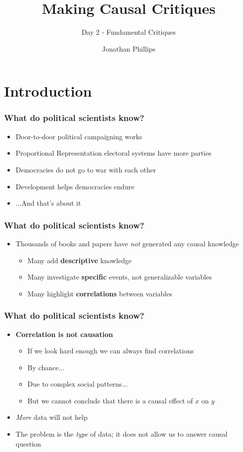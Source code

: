 \documentclass[xcolor=x11names,compress]{beamer}\usepackage[]{graphicx}\usepackage[]{color}
\title{Making Causal Critiques}
\subtitle{Day 2 - Fundamental Critiques}
\author{Jonathan Phillips}
\renewcommand{\(}{\begin{columns}}
\renewcommand{\)}{\end{columns}}
\newcommand{\<}[1]{\begin{column}{#1}}
\renewcommand{\>}{\end{column}}
\begin{document}
\frame{\titlepage}

\section{Introduction}

\begin{frame}
\frametitle{What do political scientists \textbf{know}?}
\begin{itemize}
\item Door-to-door political campaigning works
\item Proportional Representation electoral systems have more parties
\item Democracies do not go to war with each other
\item Development helps democracies endure
\item ...And that's about it
\end{itemize}
\end{frame}

\begin{frame}
\frametitle{What do political scientists \textbf{know}?}
\begin{itemize}
\item Thousands of books and papers have \textit{not} generated any causal knowledge
\begin{itemize}
\item Many add \textbf{descriptive} knowledge
\item Many investigate \textbf{specific} events, not generalizable variables
\item Many highlight \textbf{correlations} between variables
\end{itemize}
\end{itemize}
\end{frame}

\begin{frame}
\frametitle{What do political scientists \textbf{know}?}
\begin{itemize}
\item \textbf{Correlation is not causation}
\begin{itemize}
\item If we look hard enough we can always find correlations
\item By chance...
\item Due to complex social patterns...
\item But we cannot conclude that there is a causal effect of $x$ on $y$
\end{itemize}
\item \textit{More} data will not help
\item The problem is the \textit{type} of data; it does not allow us to answer causal question 
\end{itemize}
\end{frame}
\end{document}

